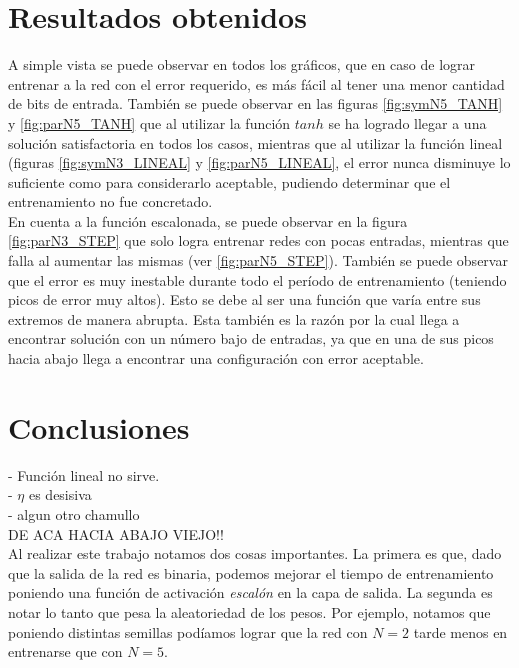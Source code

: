 \documentclass{sig-alternate}
\begin{document}
\section*{Resultados obtenidos}
A simple vista se puede observar en todos los gr\'aficos, que en caso de lograr entrenar a la red con el error requerido, es m\'as f\'acil al tener una menor cantidad de bits de entrada. 
Tambi\'en se puede observar en las figuras \ref{fig:symN5_TANH} y \ref{fig:parN5_TANH} que al utilizar la funci\'on $tanh$ se ha logrado llegar a una soluci\'on satisfactoria en todos los casos, mientras que al utilizar la funci\'on lineal (figuras \ref{fig:symN3_LINEAL} y \ref{fig:parN5_LINEAL}, el error nunca disminuye lo suficiente como para considerarlo aceptable, pudiendo determinar que el entrenamiento no fue concretado. \\
En cuenta a la funci\'on escalonada, se puede observar en la figura \ref{fig:parN3_STEP} que solo logra entrenar redes con pocas entradas, mientras que falla al aumentar las mismas (ver \ref{fig:parN5_STEP}). Tambi\'en se puede observar que el error es muy inestable durante todo el per\'iodo de entrenamiento (teniendo picos de error muy altos). Esto se debe al ser una funci\'on que var\'ia entre sus extremos de manera abrupta. Esta tambi\'en es la raz\'on por la cual llega a encontrar soluci\'on con un n\'umero bajo de entradas, ya que en una de sus picos hacia abajo llega a encontrar una configuraci\'on con error aceptable.\\



\section*{Conclusiones}

- Funci\'on lineal no sirve.\\
- $\eta$ es desisiva\\
- algun otro chamullo\\

DE ACA HACIA ABAJO VIEJO!!\\
	Al realizar este trabajo notamos dos cosas importantes.
	La primera es que, dado que la salida de la red es binaria, podemos
	mejorar el tiempo de entrenamiento poniendo una funci\'on de
	activaci\'on \textit{escal\'on} en la capa de salida.
	La segunda es notar lo tanto que pesa la aleatoriedad de los pesos.
	Por ejemplo, notamos que poniendo distintas semillas pod\'iamos lograr
	que la red con $N=2$ tarde menos en entrenarse que con $N=5$.
\end{document}
